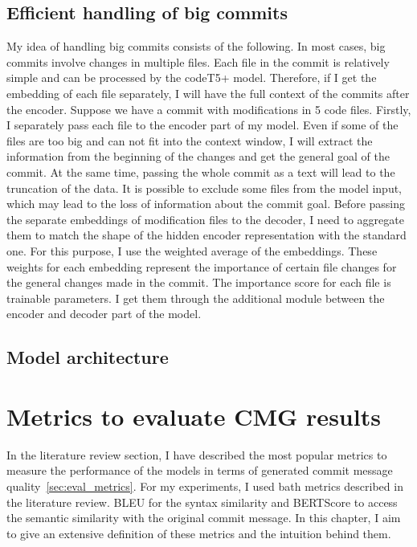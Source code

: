 \subsection{Efficient handling of big commits}
My idea of handling big commits consists of the following. In most cases, big commits involve changes in multiple files. Each file in the commit is relatively simple and can be processed by the codeT5+ model. Therefore, if I get the embedding of each file separately, I will have the full context of the commits after the encoder. Suppose we have a commit with modifications in 5 code files. Firstly, I separately pass each file to the encoder part of my model. Even if some of the files are too big and can not fit into the context window, I will extract the information from the beginning of the changes and get the general goal of the commit. At the same time, passing the whole commit as a text will lead to the truncation of the data. It is possible to exclude some files from the model input, which may lead to the loss of information about the commit goal. Before passing the separate embeddings of modification files to the decoder, I need to aggregate them to match the shape of the hidden encoder representation with the standard one. For this purpose, I use the weighted average of the embeddings. These weights for each embedding represent the importance of certain file changes for the general changes made in the commit. The importance score for each file is trainable parameters. I get them through the additional module between the encoder and decoder part of the model.

\subsection{Model architecture}

\section{Metrics to evaluate CMG results}
In the literature review section, I have described the most popular metrics to measure the performance of the models in terms of generated commit message quality~\ref{sec:eval_metrics}. For my experiments, I used bath metrics described in the literature review. BLEU for the syntax similarity and BERTScore to access the semantic similarity with the original commit message. In this chapter, I aim to give an extensive definition of these metrics and the intuition behind them.

